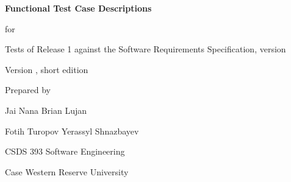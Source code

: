 \begin{titlepage}
  \centering
  \vspace*{3cm}
  {\Huge\bfseries Functional Test Case Descriptions\par}
  \vspace{0.6cm}
  {\LARGE for\par}
  \vspace{0.6cm}
  {\Huge\bfseries \SRSproduct\par}
  \vspace{0.4cm}
  {\Large Tests of Release 1 against the Software Requirements Specification, version \SRSversion\par}
  \vspace{1.5cm}
  {\Large Version \TCDversion, short edition\par}
  \vspace{0.4cm}
  {\large \TCDdate\par}
  \vfill
  {\large Prepared by\par}
  {\Large Jai Nana \quad Brian Lujan\par Fotih Turopov \quad Yerassyl Shnazbayev\par}
  \vspace{0.8cm}
  {\large CSDS 393 Software Engineering\par Case Western Reserve University\par}
  \vspace{1cm}
\end{titlepage}

